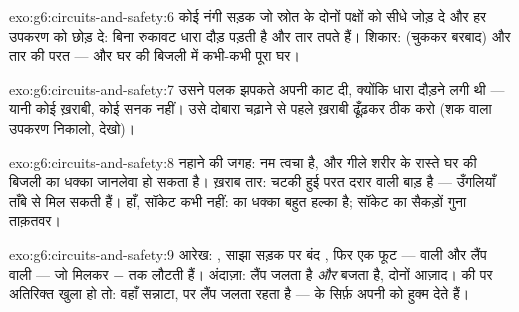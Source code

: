 \begin{solution}{exo:g6:circuits-and-safety:6}
कोई नंगी  सड़क जो स्रोत के दोनों पक्षों को सीधे जोड़ दे और हर
उपकरण को छोड़ दे: बिना रुकावट धारा दौड़ पड़ती है और तार तपते हैं।
शिकार:  (चुककर बरबाद) और तार की  परत --- और घर की
बिजली में कभी-कभी पूरा घर।
\end{solution}

\begin{solution}{exo:g6:circuits-and-safety:7}
उसने पलक झपकते अपनी  काट दी, क्योंकि धारा दौड़ने लगी थी ---
यानी कोई ख़राबी, कोई सनक नहीं। उसे दोबारा चढ़ाने से पहले ख़राबी ढूँढ़कर
ठीक करो (शक वाला उपकरण निकालो,  देखो)।
\end{solution}

\begin{solution}{exo:g6:circuits-and-safety:8}
नहाने की जगह: नम त्वचा  है, और गीले शरीर के रास्ते घर की बिजली का
धक्का जानलेवा हो सकता है। ख़राब तार: चटकी हुई परत दरार वाली बाड़ है ---
उँगलियाँ ताँबे से मिल सकती हैं।  हाँ, सॉकेट कभी नहीं:  का
धक्का बहुत हल्का है; सॉकेट का सैकड़ों गुना ताक़तवर।
\end{solution}

\begin{solution}{exo:g6:circuits-and-safety:9}
आरेख: , साझा सड़क पर बंद , फिर एक फूट ---  वाली  और
लैंप वाली  --- जो मिलकर $-$ तक लौटती हैं। अंदाज़ा: लैंप जलता है
\emph{और}  बजता है, दोनों आज़ाद।  की  पर अतिरिक्त  खुला
हो तो: वहाँ सन्नाटा, पर लैंप जलता रहता है ---  के  सिर्फ़
अपनी  को हुक्म देते हैं।
\end{solution}

